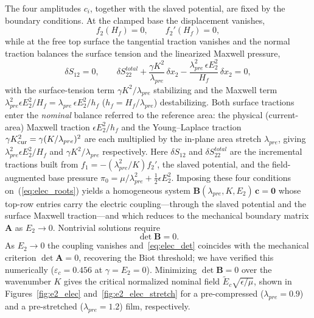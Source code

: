 \documentclass[final,3p,times]{elsarticle}
\begin{document}
The four amplitudes $c_i$, together with the slaved potential, are fixed by the boundary conditions. At the clamped base the displacement vanishes,
\begin{equation}
	f_2(H_f)=0,\qquad f_2'(H_f)=0,
\end{equation}
while at the free top surface the tangential traction vanishes and the normal traction balances the surface tension and the linearized Maxwell pressure,
\begin{equation}
	\delta S_{12}=0,\qquad
	\delta S_{22}^{total} + \frac{\gamma K^2}{\lambda_{pre}}\,\delta x_2
	- \frac{\lambda_{pre}^2\,\epsilon E_2^2}{H_f}\,\delta x_2 = 0,
	\label{eq:elec_topBC}
\end{equation}
with the surface-tension term $\gamma K^2/\lambda_{pre}$ stabilizing and the Maxwell term $\lambda_{pre}^2\epsilon E_2^2/H_f=\lambda_{pre}\,\epsilon E_2^2/h_f$ ($h_f=H_f/\lambda_{pre}$) destabilizing. Both surface tractions enter the \emph{nominal} balance referred to the reference area: the physical (current-area) Maxwell traction $\epsilon E_2^2/h_f$ and the Young--Laplace traction $\gamma K_{\rm cur}^2=\gamma(K/\lambda_{pre})^2$ are each multiplied by the in-plane area stretch $\lambda_{pre}$, giving $\lambda_{pre}^2\epsilon E_2^2/H_f$ and $\gamma K^2/\lambda_{pre}$ respectively. Here $\delta S_{12}$ and $\delta S_{22}^{total}$ are the incremental tractions built from $f_1=-(\lambda_{pre}^2/K)f_2'$, the slaved potential, and the field-augmented base pressure $\pi_0=\mu/\lambda_{pre}^2+\tfrac12\epsilon E_2^2$. Imposing these four conditions on~(\ref{eq:elec_roots}) yields a homogeneous system $\mathbf{B}(\lambda_{pre},K,E_2)\,\mathbf{c}=\mathbf{0}$ whose top-row entries carry the electric coupling---through the slaved potential and the surface Maxwell traction---and which reduces to the mechanical boundary matrix $\mathbf{A}$ as $E_2\to0$. Nontrivial solutions require
\begin{equation}
	\det\mathbf{B}=0 .
	\label{eq:elec_det}
\end{equation}
As $E_2\to0$ the coupling vanishes and~\eqref{eq:elec_det} coincides with the mechanical criterion $\det\mathbf{A}=0$, recovering the Biot threshold; we have verified this numerically ($\varepsilon_c=0.456$ at $\gamma=E_2=0$). Minimizing $\det\mathbf{B}=0$ over the wavenumber $K$ gives the critical normalized nominal field $\tilde{E}_c\sqrt{\epsilon/\mu}$, shown in Figures~\ref{fig:e2_elec} and~\ref{fig:e2_elec_stretch} for a pre-compressed ($\lambda_{pre}=0.9$) and a pre-stretched ($\lambda_{pre}=1.2$) film, respectively.
\end{document}
